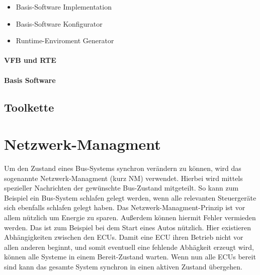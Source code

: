 \documentclass[
  a4paper,					    %
  twoside,
  DIV=calc,     				%
  bibliography=totoc,
  cleardoublepage=empty,
  ngerman,     					%
  final       					%
]{scrbook}
\begin{document}
\begin{itemize}
    \item Basis-Software Implementation
    \item Basis-Software Konfigurator
    \item Runtime-Enviroment Generator
\end{itemize}


\paragraph{VFB und RTE}


\paragraph{Basis Software}








\subsection{Toolkette}
\label{sec:Toolkette}












\section{Netzwerk-Managment}
\label{sec:Netzwerk-Managment}
Um den Zustand eines Bus-Systems synchron verändern zu können, wird das sogenannte Netzwerk-Managment (kurz NM) verwendet. Hierbei wird mittels spezieller Nachrichten der gewünschte Bus-Zustand mitgeteilt. So kann zum Beispiel ein Bus-System schlafen gelegt werden, wenn alle relevanten Steuergeräte sich ebenfalls schlafen gelegt haben. Das Netzwerk-Managment-Prinzip ist vor allem nützlich um Energie zu sparen. Außerdem können hiermit Fehler vermieden werden. Das ist zum Beispiel bei dem Start eines Autos nützlich. Hier existieren Abhängigkeiten zwischen den ECUs. Damit eine ECU ihren Betrieb nicht vor allen anderen beginnt, und somit eventuell eine fehlende Abhägkeit erzeugt wird, können alle Systeme in einem Bereit-Zustand warten. Wenn nun alle ECUs bereit sind kann das gesamte System synchron in einen aktiven Zustand übergehen.
\end{document}
